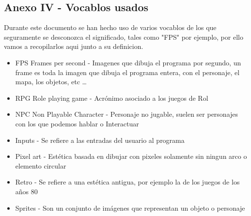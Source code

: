\documentclass[a4paper]{article}
\begin{document}
\begin{appendices}
    \section{Anexo IV - Vocablos usados}
    Durante este documento se han hecho uso de varios vocablos de los que seguramente se desconozca el significado, tales como "FPS" por ejemplo, por ello vamos a recopilarlos aqui junto a su definicion.
    \begin{itemize}
        \item FPS Frames per second - Imagenes que dibuja el programa por segundo, un frame es toda la imagen que dibuja el programa entera, con el personaje, el mapa, los objetos, etc \dots
        \item RPG Role playing game - Acrónimo asociado a los juegos de Rol
        \item NPC Non Playable Character - Personaje no jugable, suelen ser personajes con los que podemos hablar o Interactuar
        \item Inputs - Se refiere a las entradas del usuario al programa
        \item Pixel art - Estética basada en dibujar con pixeles solamente sin ningun arco o elemento circular
        \item Retro - Se refiere a una estética antigua, por ejemplo la de los juegos de los años 80
        \item Sprites - Son un conjunto de imágenes que representan un objeto o personaje
    \end{itemize}
    \clearpage

\end{appendices}
\end{document}
